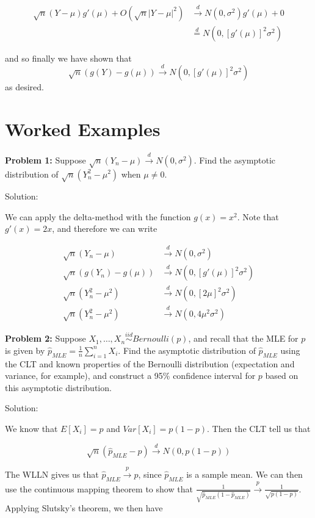 \documentclass[
  letterpaper,
  DIV=11,
  numbers=noendperiod]{scrreprt}
\begin{document}
\begin{align*}
    \sqrt{n}(Y - \mu)g'(\mu) + O(\sqrt{n} |Y - \mu|^2) & \overset{d}{\to} N(0, \sigma^2)g'(\mu) + 0\\
    & \overset{d}{=} N(0, [g'(\mu)]^2\sigma^2) 
\end{align*}

and so finally we have shown that \[
\sqrt{n}\left( g(Y) - g(\mu) \right) \overset{d}{\to}  N(0, [g'(\mu)]^2\sigma^2)
\] as desired.

\section{Worked Examples}\label{worked-examples-5}

\textbf{Problem 1:} Suppose
\(\sqrt{n}(Y_n - \mu) \overset{d}{\to} N(0, \sigma^2)\). Find the
asymptotic distribution of \(\sqrt{n}(Y_n^2 - \mu^2)\) when
\(\mu \neq 0\).

Solution:

We can apply the delta-method with the function \(g(x) = x^2\). Note
that \(g'(x) = 2x\), and therefore we can write

\begin{align*}
    \sqrt{n}(Y_n - \mu) & \overset{d}{\to} N(0, \sigma^2) \\
    \sqrt{n}(g(Y_n) - g(\mu)) & \overset{d}{\to} N(0, [g'(\mu)]^2\sigma^2) \\
    \sqrt{n}(Y_n^2 - \mu^2) & \overset{d}{\to} N(0, [2\mu]^2\sigma^2) \\
    \sqrt{n}(Y_n^2 - \mu^2) & \overset{d}{\to} N(0, 4 \mu^2\sigma^2)
\end{align*}

\textbf{Problem 2:} Suppose
\(X_1, \dots, X_n \overset{iid}{\sim} Bernoulli(p)\), and recall that
the MLE for \(p\) is given by
\(\hat{p}_{MLE} = \frac{1}{n} \sum_{i = 1}^n X_i\). Find the asymptotic
distribution of \(\hat{p}_{MLE}\) using the CLT and known properties of
the Bernoulli distribution (expectation and variance, for example), and
construct a 95\% confidence interval for \(p\) based on this asymptotic
distribution.

Solution:

We know that \(E[X_i] = p\) and \(Var[X_i] = p(1-p)\). Then the CLT tell
us that

\[
\sqrt{n}(\hat{p}_{MLE} - p) \overset{d}{\to} N(0, p(1-p))
\]

The WLLN gives us that \(\hat{p}_{MLE} \overset{p}{\to} p\), since
\(\hat{p}_{MLE}\) is a sample mean. We can then use the continuous
mapping theorem to show that
\(\frac{1}{\sqrt{\hat{p}_{MLE}(1-\hat{p}_{MLE})}} \overset{p}{\to} \frac{1}{\sqrt{p(1 - p)}}\).
Applying Slutsky's theorem, we then have
\end{document}
